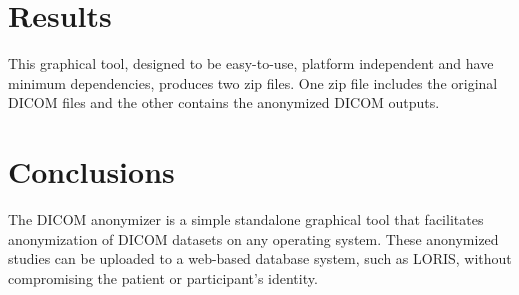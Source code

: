 \documentclass[twocolumn]{bmcart}%
\begin{document}
\section{Results}\label{results}

This graphical tool, designed to be easy-to-use, platform independent
and have minimum dependencies, produces two zip files. One zip file
includes the original DICOM files and the other contains the anonymized
DICOM outputs.

\section{Conclusions}\label{conclusions}

The DICOM anonymizer is a simple standalone graphical tool that
facilitates anonymization of DICOM datasets on any operating system.
These anonymized studies can be uploaded to a web-based database system,
such as LORIS, without compromising the patient or participant's
identity.

\end{document}

